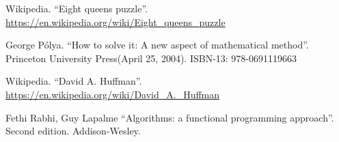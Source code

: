 \documentclass[b5paper]{article}
\begin{document}
\begin{thebibliography}{99}
Wikipedia. ``Eight queens puzzle''. \url{https://en.wikipedia.org/wiki/Eight_queens_puzzle}

George P\'{o}lya. ``How to solve it: A new aspect of mathematical method''. Princeton University Press(April 25, 2004). ISBN-13: 978-0691119663

Wikipedia. ``David A. Huffman''. \url{https://en.wikipedia.org/wiki/David_A._Huffman}

Fethi Rabhi, Guy Lapalme ``Algorithms: a functional programming approach''. Second edition. Addison-Wesley.

\end{thebibliography}

\expandafter\enddocument
\fi
\end{document}
